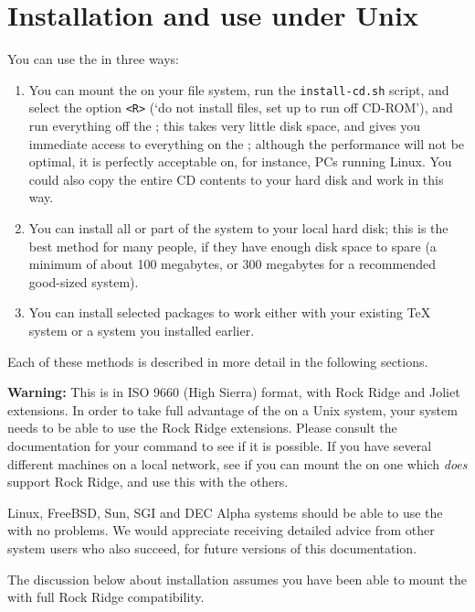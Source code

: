 \documentclass{article}
\begin{document}
\section{Installation and use under Unix}
\label{sec:install}
You can use the \TeXLive{} \CD{} in three ways:
\begin{enumerate}
\item You can mount the \CD{} on your file system, run
the  \texttt{install-cd.sh} script, and select the option \verb|<R>| 
  (`do not install files, set up to run off CD-ROM'), 
  and run everything off the \CD; this takes very
  little disk space, and gives you immediate access to everything on
  the \CD; although the performance will not be optimal, it is
  perfectly acceptable on, for instance, PCs running Linux. You could
  also copy the entire CD contents to your hard disk and work in this way.
\item You can install all or part of the system to your local hard
  disk; this is the best method for many people, if they have enough
  disk space to spare (a minimum of about 100 megabytes, or 300
  megabytes for a recommended good-sized system).
\item You can install selected packages to work either with your
  existing \TeX{} system or a \TeXLive{} system you installed earlier.
\end{enumerate}
Each of these methods is described in more detail in the following
sections.

\ifSingleColumn
\begin{figure*}
  \begin{center}
    \leavevmode
\fi
\begin{warningbox}
\textbf{Warning: } This \CD{} is in ISO 9660 (High Sierra) format,
with Rock Ridge and Joliet extensions. In order to take full advantage
of the \CD{} on a Unix system, your system needs to be able to use
the Rock Ridge extensions.  Please consult the documentation for your
 command to see if it is possible.  If you have several
different machines on a local network, see if you can mount the
\CD{} on one which \emph{does} support Rock Ridge, and use this with
the others.

\leavevmode\quad
Linux, FreeBSD, Sun, SGI and DEC Alpha systems should be able to use
the \CD{} with no problems. We would appreciate receiving detailed advice
from other system users who also succeed, for future versions of this
documentation.

\leavevmode\quad
The discussion below about installation assumes you have been able to mount
the \CD{} with full Rock Ridge compatibility.
\end{warningbox}
\ifSingleColumn
  \end{center}
\end{figure*}
\fi
\end{document}
